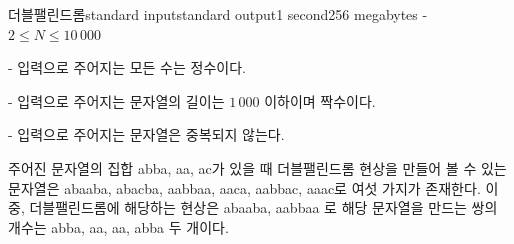 \begin{problem}{더블팰린드롬}{standard input}{standard output}{1 second}{256 megabytes}
\Note
- $2 \le N \le 10\,000$  

- 입력으로 주어지는 모든 수는 정수이다.

- 입력으로 주어지는 문자열의 길이는 $1\,000$ 이하이며 짝수이다. 

- 입력으로 주어지는 문자열은 중복되지 않는다. 

주어진 문자열의 집합 {abba, aa, ac}가 있을 때 더블팰린드롬 현상을 만들어 볼 수 있는 문자열은 {abaaba, abacba, aabbaa, aaca, aabbac, aaac}로 여섯 가지가 존재한다. 이 중, 더블팰린드롬에 해당하는 현상은 {abaaba, aabbaa} 로 해당 문자열을 만드는 쌍의 개수는 {abba, aa}, {aa, abba} 두 개이다.

\end{problem}

